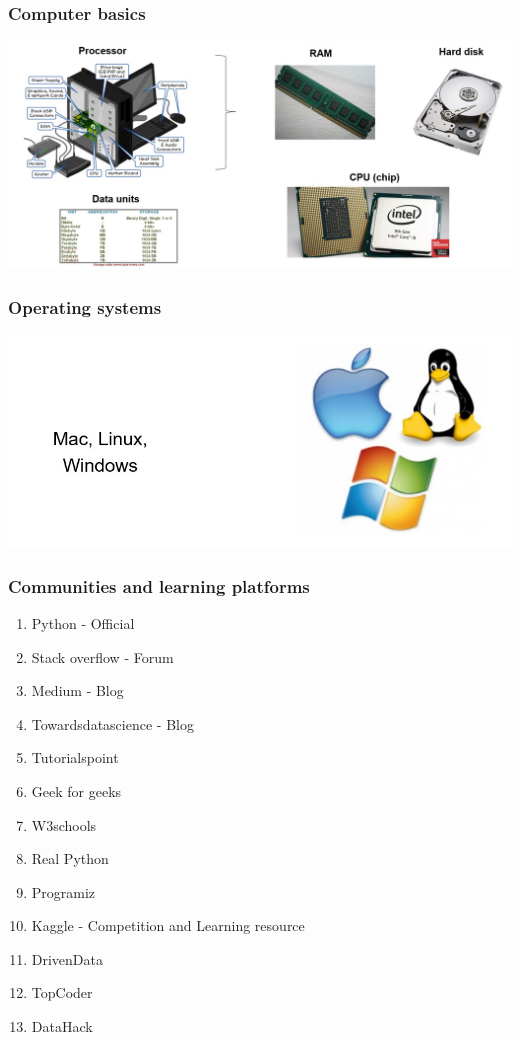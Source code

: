 \documentclass{beamer}
\begin{document}
\begin{frame}
    \frametitle{Computer basics}
    \centering
    \includegraphics[scale = 0.35]{figures/computer.jpg}
\end{frame}

\begin{frame}
    \frametitle{Operating systems}
    \centering
    \includegraphics[scale = 0.5]{figures/os.jpg}
\end{frame}

\begin{frame}
    \frametitle{Communities and learning platforms}
    \begin{multicols}{2}
        \begin{enumerate}
            \item Python - Official
            \item Stack overflow - Forum
            \item Medium - Blog
            \item Towardsdatascience - Blog
            \item Tutorialspoint
            \item Geek for geeks
            \item W3schools
            \item Real Python
            \item Programiz
            \item Kaggle - Competition and Learning resource
            \item DrivenData
            \item TopCoder
            \item DataHack
        \end{enumerate}
    \end{multicols}
\end{frame}
\end{document}
